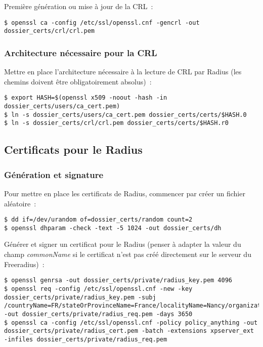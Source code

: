 Première génération ou mise à jour de la CRL~:

\begin{lstlisting}
$ openssl ca -config /etc/ssl/openssl.cnf -gencrl -out dossier_certs/crl/crl.pem
\end{lstlisting}

\subsubsection{Architecture nécessaire pour la CRL}

Mettre en place l'architecture nécessaire à la lecture de CRL par Radius (les chemins doivent être obligatoirement absolus)~:

\begin{lstlisting}
$ export HASH=$(openssl x509 -noout -hash -in dossier_certs/users/ca_cert.pem)
$ ln -s dossier_certs/users/ca_cert.pem dossier_certs/certs/$HASH.0
$ ln -s dossier_certs/crl/crl.pem dossier_certs/certs/$HASH.r0
\end{lstlisting}

\subsection{Certificats pour le Radius}
\subsubsection{Génération et signature}

Pour mettre en place les certificats de Radius, commencer par créer un fichier aléatoire~: 

\begin{lstlisting}
$ dd if=/dev/urandom of=dossier_certs/random count=2
$ openssl dhparam -check -text -5 1024 -out dossier_certs/dh
\end{lstlisting}

Générer et signer un certificat pour le Radius (penser à adapter la valeur du champ \emph{commonName} si le certificat n'est pas créé directement sur le serveur du Freeradius)~:

\begin{lstlisting}
$ openssl genrsa -out dossier_certs/private/radius_key.pem 4096
$ openssl req -config /etc/ssl/openssl.cnf -new -key dossier_certs/private/radius_key.pem -subj /countryName=FR/stateOrProvinceName=France/localityName=Nancy/organizationName=BHConsulting/commonName=$(hostname)/ -out dossier_certs/private/radius_req.pem -days 3650
$ openssl ca -config /etc/ssl/openssl.cnf -policy policy_anything -out dossier_certs/private/radius_cert.pem -batch -extensions xpserver_ext -infiles dossier_certs/private/radius_req.pem
\end{lstlisting}

